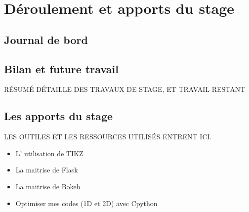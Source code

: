 
\chapter{Déroulement et apports du stage} %

\label{Chapter5} %







\section{Journal de bord}












\section{Bilan et future travail}

RÉSUMÉ DÉTAILLE DES TRAVAUX DE STAGE, ET TRAVAIL RESTANT














\section{Les apports du stage}

LES OUTILES ET LES RESSOURCES UTILISÉS ENTRENT ICI.





\begin{itemize}
   \item L' utilisation de TIKZ
   \item La maitrise de Flask
   \item La maitrise de Bokeh
\end{itemize}

\begin{itemize}
    \item Optimiser mes codes (1D et 2D) avec Cpython
\end{itemize}


